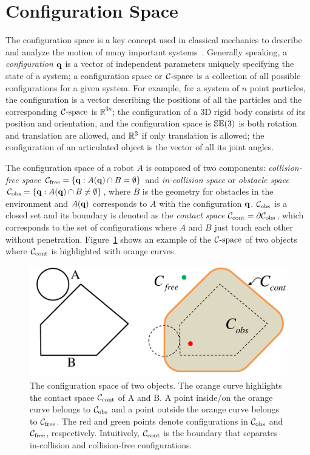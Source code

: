 \section{Configuration Space}
\label{sec:1:configurationSpace}
The configuration space is a key concept used in classical mechanics to describe and analyze the motion of many important systems~\cite{Arnold:1989}. Generally speaking, a \emph{configuration} $\mathbf q$ is a vector of independent parameters uniquely specifying the state of a system; a configuration space or $\mathcal C\text{-space}$ is a collection of all possible configurations for a given system. For example, for a system of $n$ point particles, the configuration is a vector describing the positions of all the particles and the corresponding $\mathcal C\text{-space}$ is $\mathbb R^{3n}$; the configuration of a 3D rigid body consists of its position and orientation, and the configuration space is $\mathbb {SE}(3)$ is both rotation and translation are allowed, and $\mathbb R^3$ if only translation is allowed; the configuration of an articulated object is the vector of all its joint angles.

The configuration space of a robot $A$ is composed of two components: \emph{collision-free space} $\mathcal C_{\text{free}} = \{\mathbf q: A(\mathbf q) \cap B = \emptyset\}$ and \emph{in-collision space} or \emph{obstacle space} $\mathcal C_{\text{obs}} = \{\mathbf q: A(\mathbf q) \cap B \neq \emptyset\}$, where $B$ is the geometry for obstacles in the environment and $A(\mathbf q)$ corresponds to $A$ with the configuration $\mathbf q$. $\mathcal C_{\text{obs}}$ is a closed set and its boundary is denoted as the \emph{contact space} $\mathcal C_\text{cont} = \partial \mathcal C_{\text{obs}}$, which corresponds to the set of configurations where $A$ and $B$ just touch each other without penetration. Figure~\ref{fig:1:contactspace} shows an example of the $\mathcal C\text{-space}$ of two objects where $\mathcal C_\text{cont}$ is highlighted with orange curves.

\begin{figure}[htb]
  \centering
  \includegraphics[width=0.6\linewidth]{figs/1/Ccont.pdf}
  \caption[The configuration space of two objects]{The configuration space of two objects. The orange curve highlights the contact space $\mathcal C_\text{cont}$ of A and B. A point inside/on the orange curve belongs to
  $\mathcal C_{\text{obs}}$ and a point outside the orange curve belongs to $\mathcal C_{\text{free}}$.
  The red and green points denote configurations in $\mathcal C_{\text{obs}}$ and $\mathcal C_{\text{free}}$, respectively. Intuitively, $\mathcal C_\text{cont}$ is the boundary that separates in-collision and collision-free configurations.}
  \label{fig:1:contactspace}
\end{figure}

